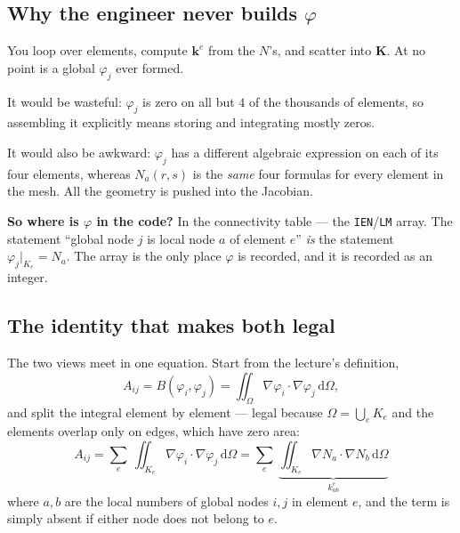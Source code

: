 \documentclass[11pt]{article}
\newcommand{\dOm}{\,\mathrm{d}\Omega}
\newcommand{\grad}{\nabla}
\begin{document}
\subsection*{Why the engineer never builds $\varphi$}

\begin{steps}
\item You loop over elements, compute $\bm{k}^{e}$ from the $N$'s, and scatter
      into $\bm{K}$. At no point is a global $\varphi_{j}$ ever formed.
\item It would be wasteful: $\varphi_{j}$ is zero on all but $4$ of the
      thousands of elements, so assembling it explicitly means storing and
      integrating mostly zeros.
\item It would also be awkward: $\varphi_{j}$ has a different algebraic
      expression on each of its four elements, whereas $N_{a}(r,s)$ is the
      \emph{same} four formulas for every element in the mesh. All the geometry
      is pushed into the Jacobian.
\item \textbf{So where is $\varphi$ in the code?} In the connectivity table ---
      the \texttt{IEN}/\texttt{LM} array. The statement ``global node $j$ is
      local node $a$ of element $e$'' \emph{is} the statement
      $\varphi_{j}|_{K_{e}}=N_{a}$. The array is the only place $\varphi$ is
      recorded, and it is recorded as an integer.
\end{steps}

\subsection*{The identity that makes both legal}

The two views meet in one equation. Start from the lecture's definition,
\begin{equation}\label{eq:Aij}
  A_{ij}=B(\varphi_{i},\varphi_{j})
        =\iint_{\Omega}\grad\varphi_{i}\cdot\grad\varphi_{j}\dOm ,
\end{equation}
and split the integral element by element --- legal because
$\Omega=\bigcup_{e}K_{e}$ and the elements overlap only on edges, which have
zero area:
\begin{equation}\label{eq:assembly}
  \boxed{\;
  A_{ij}=\sum_{e}\ \iint_{K_{e}}\grad\varphi_{i}\cdot\grad\varphi_{j}\dOm
        =\sum_{e}\ \underbrace{\iint_{K_{e}}\grad N_{a}\cdot\grad N_{b}\dOm}
                              _{\textstyle k^{e}_{ab}}\;}
\end{equation}
where $a,b$ are the local numbers of global nodes $i,j$ in element $e$, and the
term is simply absent if either node does not belong to $e$.
\end{document}
